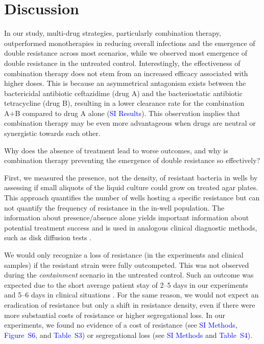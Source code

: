 \documentclass[9pt,twocolumn,twoside,lineno]{pnas-new}
\newcommand{\sifig}[1]{\textcolor{blue}{Figure~S#1}}
\newcommand{\sitab}[1]{\textcolor{blue}{Table~S#1}}
\newcommand{\sisec}[1]{\textcolor{blue}{#1}}
\begin{document}
    \section*{Discussion}
    In our study, multi-drug strategies, particularly combination therapy, outperformed monotherapies in reducing overall infections and the emergence of double resistance across most scenarios, while we observed most emergence of double resistance in the untreated control.
    Interestingly, the effectiveness of combination therapy does not stem from an increased efficacy associated with higher doses. 
    This is because an asymmetrical antagonism exists between the bactericidal antibiotic ceftazidime (drug A) and the bacteriostatic antibiotic tetracycline (drug B), resulting in a lower clearance rate for the combination A+B compared to drug A alone (\sisec{SI Results}). 
    This observation implies that combination therapy may be even more advantageous when drugs are neutral or synergistic towards each other.
    
    Why does the absence of treatment lead to worse outcomes, and why is combination therapy preventing the emergence of double resistance so effectively?
    
    First, we measured the presence, not the density, of resistant bacteria in wells by assessing if small aliquots of the liquid culture could grow on treated agar plates. 
    This approach quantifies the number of wells hosting a specific resistance but can not quantify the frequency of resistance in the in-well population. 
    The information about presence/absence alone yields important information about potential treatment success and is used in analogous clinical diagnostic methods, such as disk diffusion tests \cite{eucast_disk2024}.
    
    We would only recognize a loss of resistance (in the experiments and clinical samples) if the resistant strain were fully outcompeted. 
    This was not observed during the \textit{containment} scenario in the untreated control.
    Such an outcome was expected due to the short average patient stay of 2--5 days in our experiments and 5--6 days in clinical situations \cite{BAG2015}.
    For the same reason, we would not expect an eradication of resistance but only a shift in resistance density, even if there were more substantial costs of resistance or higher segregational loss.
    In our experiments, we found no evidence of a cost of resistance (see \sisec{SI Methods}, \sifig{6}, and \sitab{3}) or segregational loss (see \sisec{SI Methods} and \sitab{4}).
    
\end{document}
